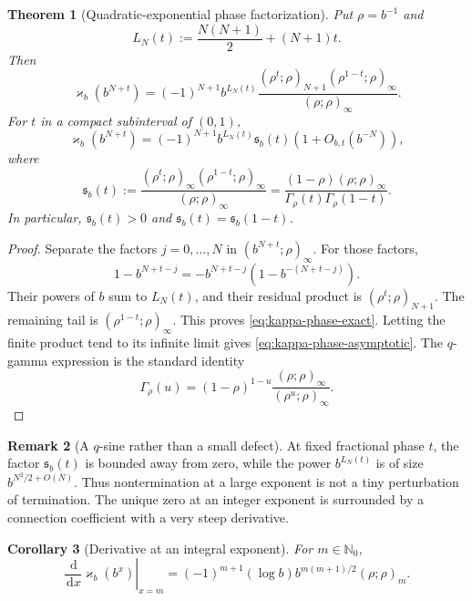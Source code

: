 \documentclass[11pt]{article}
\newtheorem{theorem}{Theorem}[section]
\newtheorem{corollary}[theorem]{Corollary}
\theoremstyle{definition}
\newtheorem{remark}[theorem]{Remark}
\newcommand{\kk}{\varkappa}
\newcommand{\N}{\mathbb{N}}
\newcommand{\qpf}[3]{\left(#1;#2\right)_{#3}}
\newcommand{\qpi}[2]{\left(#1;#2\right)_{\!\infty}}
\newcommand{\dd}{\,\mathrm{d}}
\begin{document}
\begin{theorem}[Quadratic-exponential phase factorization]\label{thm:phase-factorization}
Put $\rho=b^{-1}$ and
\[
 L_N(t):=\frac{N(N+1)}2+(N+1)t.
\]
Then
\begin{equation}\label{eq:kappa-phase-exact}
 \kk_b(b^{N+t})
 =(-1)^{N+1}b^{L_N(t)}
 \frac{\qpf{\rho^t}{\rho}{N+1}\qpi{\rho^{1-t}}{\rho}}
      {\qpi{\rho}{\rho}}.
\end{equation}
For $t$ in a compact subinterval of $(0,1)$,
\begin{equation}\label{eq:kappa-phase-asymptotic}
 \kk_b(b^{N+t})
 =(-1)^{N+1}b^{L_N(t)}\mathfrak{s}_b(t)
 \left(1+O_{b,t}(b^{-N})\right),
\end{equation}
where
\begin{equation}\label{eq:q-sine-factor}
 \mathfrak{s}_b(t)
 :=\frac{\qpi{\rho^t}{\rho}\qpi{\rho^{1-t}}{\rho}}
          {\qpi{\rho}{\rho}}
 =\frac{(1-\rho)\qpi{\rho}{\rho}}
        {\Gamma_\rho(t)\Gamma_\rho(1-t)}.
\end{equation}
In particular, $\mathfrak{s}_b(t)>0$ and $\mathfrak{s}_b(t)=\mathfrak{s}_b(1-t)$.
\end{theorem}

\begin{proof}
Separate the factors $j=0,\dots,N$ in $\qpi{b^{N+t}}{\rho}$.  For those factors,
\[
 1-b^{N+t-j}=-b^{N+t-j}\left(1-b^{-(N+t-j)}\right).
\]
Their powers of $b$ sum to $L_N(t)$, and their residual product is $\qpf{\rho^t}{\rho}{N+1}$.  The remaining tail is $\qpi{\rho^{1-t}}{\rho}$.  This proves \eqref{eq:kappa-phase-exact}.  Letting the finite product tend to its infinite limit gives \eqref{eq:kappa-phase-asymptotic}.  The $q$-gamma expression is the standard identity
\[
 \Gamma_\rho(u)=(1-\rho)^{1-u}
 \frac{\qpi{\rho}{\rho}}{\qpi{\rho^u}{\rho}}.
\]
\end{proof}

\begin{remark}[A $q$-sine rather than a small defect]
At fixed fractional phase $t$, the factor $\mathfrak{s}_b(t)$ is bounded away from zero, while the power $b^{L_N(t)}$ is of size $b^{N^2/2+O(N)}$.  Thus nontermination at a large exponent is not a tiny perturbation of termination.  The unique zero at an integer exponent is surrounded by a connection coefficient with a very steep derivative.
\end{remark}

\begin{corollary}[Derivative at an integral exponent]\label{cor:kappa-derivative}
For $m\in\N_0$,
\begin{equation}\label{eq:kappa-derivative}
 \left.\frac{\dd}{\dd x}\kk_b(b^x)\right|_{x=m}
 =(-1)^{m+1}(\log b)b^{m(m+1)/2}\qpf{\rho}{\rho}{m}.
\end{equation}
\end{corollary}
\end{document}
